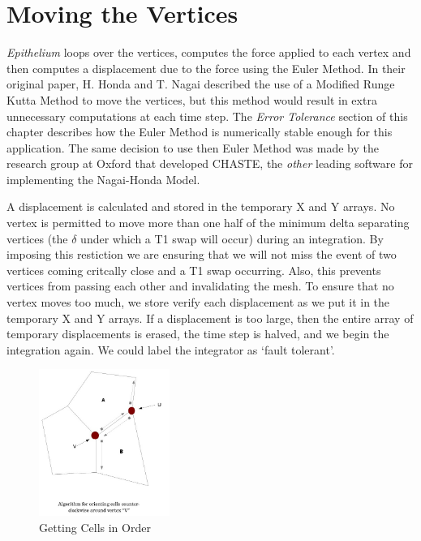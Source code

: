 \section{Moving the Vertices}
\emph{Epithelium} loops over the vertices, computes the force applied to each vertex and then computes a displacement due to the force using the Euler Method. In their original paper, H. Honda and T. Nagai described the use of a Modified Runge Kutta Method to move the vertices, but this method would result in extra unnecessary computations at each time step. The \emph{Error Tolerance} section of this chapter describes how the Euler Method is numerically stable enough for this application. The same decision to use then Euler Method was made by the research group at Oxford that developed CHASTE, the \emph{other} leading software for implementing the Nagai-Honda Model. 

A displacement is calculated and stored in the temporary X and Y arrays. No vertex is permitted to move more than one half of the minimum delta separating vertices (the $\delta$ under which a T1 swap will occur) during an integration. By imposing this restiction we are ensuring that we will not miss the event of two vertices coming critcally close and a T1 swap occurring. Also, this prevents vertices from passing each other and invalidating the mesh. To ensure that no vertex moves too much, we store verify each displacement as we put it in the temporary X and Y arrays. If a displacement is too large, then the entire array of temporary displacements is erased, the time step is halved, and we begin the integration again. We could label the integrator as `fault tolerant'.

\begin{figure}
\begin{center}
\includegraphics[width=0.38\textwidth]{../diagrams/counterclockwise.jpg}
\end{center}
\caption{Getting Cells in Order}
\label{fig:ctrclockwise}
\end{figure}

